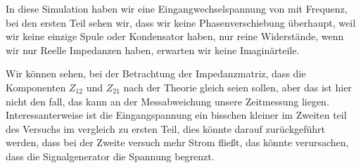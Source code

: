 %
%
%
%
In diese Simulation haben wir eine Eingangwechselspannung von mit Frequenz, bei den ersten Teil sehen wir, dass wir keine Phasenverschiebung überhaupt, weil wir keine einzige Spule oder Kondensator haben, nur reine Widerstände, wenn wir nur Reelle Impedanzen haben, erwarten wir keine Imaginärteile.

Wir können sehen, bei der Betrachtung der Impedanzmatriz, dass die Komponenten $Z_{12}$ und $Z_{21}$ nach der Theorie gleich seien sollen, aber das ist hier nicht den fall, das kann an der Messabweichung unsere Zeitmessung liegen. Interessanterweise ist die Eingangspannung ein bisschen kleiner im Zweiten teil des Versuchs im vergleich zu ersten Teil, dies könnte darauf zurückgeführt werden, dass bei der Zweite versuch mehr Strom fließt, das könnte verursachen, dass die Signalgenerator die Spannung begrenzt. 

%
\begin{flushright}
  \textit{\autorA}
\end{flushright}
%
%
%
%